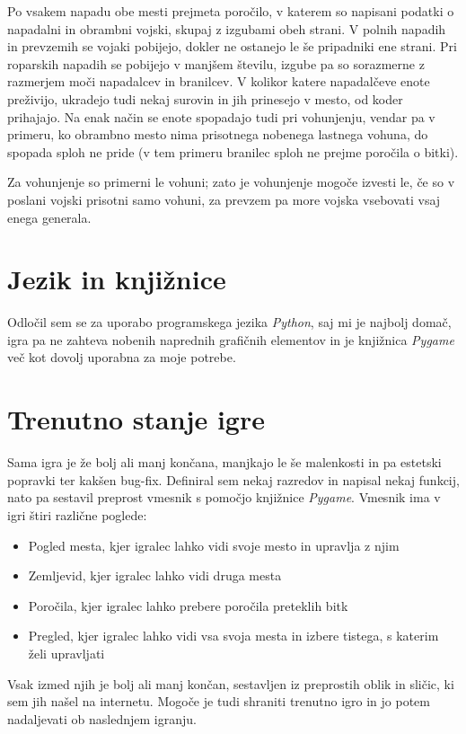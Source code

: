 \documentclass[a4paper, 16pt]{article}
\begin{document}
Po vsakem napadu obe mesti prejmeta poročilo, v katerem so napisani podatki o napadalni in obrambni vojski, skupaj z izgubami obeh strani.
V polnih napadih in prevzemih se vojaki pobijejo, dokler ne ostanejo le še pripadniki ene strani. Pri roparskih napadih se pobijejo v manjšem številu, izgube pa so sorazmerne z 
razmerjem moči napadalcev in branilcev. V kolikor katere napadalčeve enote preživijo, ukradejo tudi nekaj surovin in jih prinesejo v mesto, od koder prihajajo.
Na enak način se enote spopadajo tudi pri vohunjenju, vendar pa v primeru, ko obrambno mesto nima prisotnega nobenega lastnega vohuna, do spopada sploh ne pride (v tem primeru branilec sploh ne prejme poročila o bitki).

Za vohunjenje so primerni le vohuni; zato je vohunjenje mogoče izvesti le, če so v poslani vojski prisotni samo vohuni, za 
prevzem pa more vojska vsebovati vsaj enega generala.

\section{Jezik in knjižnice}

Odločil sem se za uporabo programskega jezika \textit{Python}, saj mi je najbolj domač, igra pa ne zahteva nobenih naprednih grafičnih elementov in je knjižnica 
\textit{Pygame} več kot dovolj uporabna za moje potrebe. 

\section{Trenutno stanje igre}

Sama igra je že bolj ali manj končana, manjkajo le še malenkosti in pa estetski popravki ter kakšen bug-fix. Definiral sem nekaj razredov in napisal nekaj funkcij,
nato pa sestavil preprost vmesnik s pomočjo knjižnice \textit{Pygame}. Vmesnik ima v igri štiri različne poglede:
\begin{itemize}
    \item Pogled mesta, kjer igralec lahko vidi svoje mesto in upravlja z njim
    \item Zemljevid, kjer igralec lahko vidi druga mesta
    \item Poročila, kjer igralec lahko prebere poročila preteklih bitk
    \item Pregled, kjer igralec lahko vidi vsa svoja mesta in izbere tistega, s katerim želi upravljati
\end{itemize}
Vsak izmed njih je bolj ali manj končan, sestavljen iz preprostih oblik in sličic, ki sem jih našel na internetu. Mogoče je tudi shraniti trenutno igro in jo potem nadaljevati
ob naslednjem igranju. 
\end{document}
